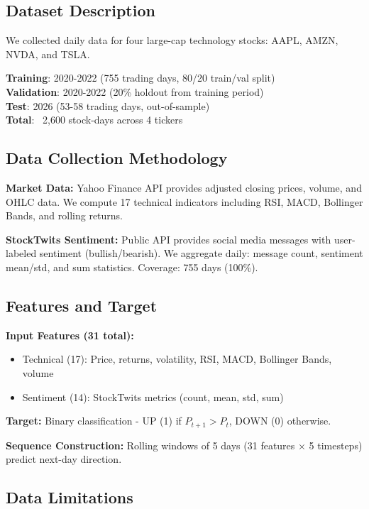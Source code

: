 \documentclass[10pt,twocolumn]{article}
\begin{document}
\subsection{Dataset Description}

We collected daily data for four large-cap technology stocks: AAPL, AMZN, NVDA, and TSLA.

\textbf{Training}: 2020-2022 (755 trading days, 80/20 train/val split)\\
\textbf{Validation}: 2020-2022 (20\% holdout from training period)\\
\textbf{Test}: 2026 (53-58 trading days, out-of-sample)\\
\textbf{Total}: ~2,600 stock-days across 4 tickers

\subsection{Data Collection Methodology}

\textbf{Market Data:} Yahoo Finance API provides adjusted closing prices, volume, and OHLC data. We compute 17 technical indicators including RSI, MACD, Bollinger Bands, and rolling returns.

\textbf{StockTwits Sentiment:} Public API provides social media messages with user-labeled sentiment (bullish/bearish). We aggregate daily: message count, sentiment mean/std, and sum statistics. Coverage: 755 days (100\%).

\subsection{Features and Target}

\textbf{Input Features (31 total):}
\begin{itemize}
\item Technical (17): Price, returns, volatility, RSI, MACD, Bollinger Bands, volume
\item Sentiment (14): StockTwits metrics (count, mean, std, sum)
\end{itemize}

\textbf{Target:} Binary classification - UP (1) if $P_{t+1} > P_t$, DOWN (0) otherwise.

\textbf{Sequence Construction:} Rolling windows of 5 days (31 features × 5 timesteps) predict next-day direction.

\subsection{Data Limitations}
\end{document}
